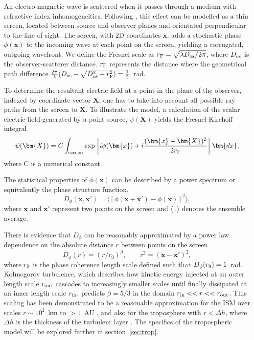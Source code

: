 An electro-magnetic wave is scattered when it passes through a medium with refractive index inhomogeneities. Following \citet{Narayan_1992}, this effect can be modelled as a thin screen, located between source and observer planes and orientated perpendicular to the line-of-sight. The screen, with 2D coordinates $\mathbf{x}$, adds a stochastic phase $\phi(\mathbf{x})$ to the incoming wave at each point on the screen, yielding a corrugated, outgoing wavefront. We define the Fresnel scale as  $r_{\rm F} = \sqrt{\lambda D_{\rm os}/2\pi}$, where $D_{\rm os}$ is the observer-scatterer distance.  $r_{\rm F}$ represents the distance where the geometrical path difference $\frac{2\pi}{\lambda} (D_{\rm os} - \sqrt{D_{\rm os}^2 + r_{\rm F}^2}) =\frac{1}{2}$~rad.

To determine the resultant electric field at a point in the plane of the observer, indexed by coordinate vector $\bm{X}$, one has to take into account all possible ray paths from the screen to $\bm{X}$. To illustrate the model, a calculation of the scalar electric field generated by a point source, $\psi(\bm{X})$ yields the Fresnel-Kirchoff integral \citep*{BORN_1980}
\begin{equation}\label{Fresnel- Kirchoff}
\psi(\bm{X}) = C \int_{\rm screen} \exp\left[i\phi(\bm{x}) + i \frac{(\bm{x}-\bm{X})^2}{2 r_{\rm F}}\right]\bm{dx},
\end{equation}
where C is a numerical constant.

The statistical properties of $\phi(\mathbf{x})$ can be described by a power spectrum or equivalently the phase structure function,
\begin{equation}\label{eq:D_phi}
D_\phi (\mathbf{x},\mathbf{x'}) = \langle \left[ \phi(\mathbf{x} +\mathbf{x'}) - \phi(\mathbf{x})\right]^2 \rangle,
\end{equation}
where $\mathbf{x}$ and $\mathbf{x'} $ represent two points on the screen and $\langle .. \rangle$ denotes the ensemble average. 

There is evidence that $D_\phi$ can be reasonably approximated by a power law dependence on the absolute distance $r$ between points on the screen  \citep{Armstrong_1995,Carilli_1997}
\begin{equation}
D_\phi (r) =  (r/r_0)^\beta,\qquad r^2 = (\mathbf{x} - \mathbf{x'})^2,
\label{kolmogorov}
\end{equation}
where $r_{\rm 0}$ is the phase coherence length scale defined such that $D_\phi(r_{\rm 0}) = 1$~rad. 
Kolmogorov turbulence, which describes how kinetic energy injected at an outer length scale $r_{\rm out}$ cascades to increasingly smaller scales until finally dissipated at an inner length scale $r_{\rm in}$, predicts $\beta = 5/3$ in the domain ${r_{\rm in}<<r<<r_{\rm out}}$. This scaling has been demonstrated to be a reasonable approximation for the ISM over scales $r \sim 10^2$~km to $>1$~AU \citep*{Johnson_2015a}, and also for the troposphere with $r< \Delta h$, where $\Delta h$ is the thickness of the turbulent layer \citep{Coulman_1985}. The specifics of the tropospheric model will be explored further in section~\ref{sec:trop}.

